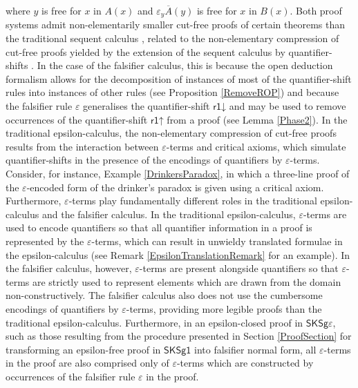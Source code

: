 \documentclass[10pt]{article}
\theoremstyle{definition}\newtheorem{remark}[theorem]{Remark}
\theoremstyle{definition}\newtheorem{example}[theorem]{Example}
\theoremstyle{definition}\newtheorem{definition}[theorem]{Definition}
\newcommand{\SKSq}{{\mathsf{SKSg1}}}
\newcommand{\FalsifierCalculus}{{\mathsf{SKSg\varepsilon}}}
\newcommand{\rOneUp}{{\mathsf{r1\mathord\uparrow}}}
\newcommand{\rOneDown}{{\mathsf{r1\mathord\downarrow}}}
\newcommand{\falsifierRule}{{\mathsf{\varepsilon}}}
\begin{document}
	where $y$ is free for $x$ in $A(x)$ and $\varepsilon_y \overline{A}(y)$ is free for $x$ in $B(x)$. Both proof systems admit non-elementarily smaller cut-free proofs of certain theorems than the traditional sequent calculus \cite{BaazLolicEpsilonShorterProofs}, related to the non-elementary compression of cut-free proofs yielded by the extension of the sequent calculus by quantifier-shifts \cite{BaazUnsoundInferences}. In the case of the falsifier calculus, this is because the open deduction formalism allows for the decomposition of instances of most of the quantifier-shift rules into instances of other rules (see Proposition \ref{RemoveROP}) and because the falsifier rule $\falsifierRule$ generalises the quantifier-shift $\rOneDown$ and may be used to remove occurrences of the quantifier-shift $\rOneUp$ from a proof (see Lemma \ref{Phase2}). In the traditional epsilon-calculus, the non-elementary compression of cut-free proofs results from the interaction between $\varepsilon$-terms and critical axioms, which simulate quantifier-shifts in the presence of the encodings of quantifiers by $\varepsilon$-terms. Consider, for instance, Example \ref{DrinkersParadox}, in which a three-line proof of the $\varepsilon$-encoded form of the drinker's paradox is given using a critical axiom. Furthermore, $\varepsilon$-terms play fundamentally different roles in the traditional epsilon-calculus and the falsifier calculus. In the traditional epsilon-calculus, $\varepsilon$-terms are used to encode quantifiers so that all quantifier information in a proof is represented by the $\varepsilon$-terms, which can result in unwieldy translated formulae in the epsilon-calculus (see Remark \ref{EpsilonTranslationRemark} for an example). In the falsifier calculus, however, $\varepsilon$-terms are present alongside quantifiers so that $\varepsilon$-terms are strictly used to represent elements which are drawn from the domain non-constructively. The falsifier calculus also does not use the cumbersome encodings of quantifiers by $\varepsilon$-terms, providing more legible proofs than the traditional epsilon-calculus. Furthermore, in an epsilon-closed proof in $\FalsifierCalculus$, such as those resulting from the procedure presented in Section \ref{ProofSection} for transforming an epsilon-free proof in $\SKSq$ into falsifier normal form, all $\varepsilon$-terms in the proof are also comprised only of $\varepsilon$-terms which are constructed by occurrences of the falsifier rule $\falsifierRule$ in the proof.
	
\end{document}
